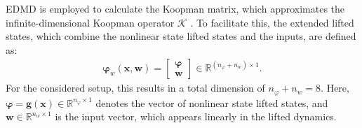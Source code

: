 EDMD is employed to calculate the Koopman matrix, which approximates the infinite-dimensional Koopman operator $\mathcal{K}$ \cite{arbabi2018data}. To facilitate this, the extended lifted states, which combine the nonlinear state lifted states and the inputs, are defined as:
\begin{align}\label{eq:extLiftObs}
    \bm{\varphi}_w(\bm{x},\bm{w}) = 
    \begin{bmatrix}
        \bm{ \varphi}\\ \bm{w}
    \end{bmatrix} \in \mathbb{R}^{(n_\varphi + n_w) \times 1}.
\end{align}
For the considered setup, this results in a total dimension of $n_\varphi + n_w = 8$. Here, $\bm{\varphi} = \bm{g}(\bm{x}) \in \mathbb{R}^{n_\varphi \times 1}$ denotes the vector of nonlinear state lifted states, and $\bm{w} \in \mathbb{R}^{n_w \times 1}$ is the input vector, which appears linearly in the lifted dynamics.

